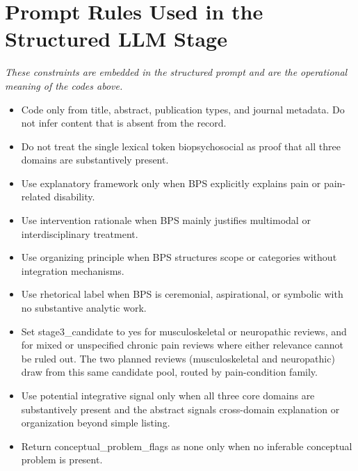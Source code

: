 \documentclass[11pt]{article}
\begin{document}
\section*{Prompt Rules Used in the Structured LLM Stage}
{\small\itshape These constraints are embedded in the structured prompt and are the operational meaning of the codes above.}\par\smallskip
\begin{itemize}
\item Code only from title, abstract, publication types, and journal metadata. Do not infer content that is absent from the record.
\item Do not treat the single lexical token biopsychosocial as proof that all three domains are substantively present.
\item Use explanatory framework only when BPS explicitly explains pain or pain-related disability.
\item Use intervention rationale when BPS mainly justifies multimodal or interdisciplinary treatment.
\item Use organizing principle when BPS structures scope or categories without integration mechanisms.
\item Use rhetorical label when BPS is ceremonial, aspirational, or symbolic with no substantive analytic work.
\item Set stage3\_candidate to yes for musculoskeletal or neuropathic reviews, and for mixed or unspecified chronic pain reviews where either relevance cannot be ruled out. The two planned reviews (musculoskeletal and neuropathic) draw from this same candidate pool, routed by pain-condition family.
\item Use potential integrative signal only when all three core domains are substantively present and the abstract signals cross-domain explanation or organization beyond simple listing.
\item Return conceptual\_problem\_flags as none only when no inferable conceptual problem is present.
\end{itemize}
\end{document}
